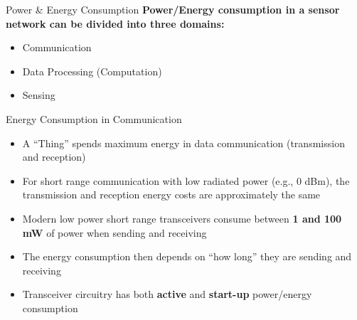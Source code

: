 \documentclass[aspectratio=169,11pt]{beamer}
\begin{document}
\begin{frame}{Power \& Energy Consumption}
    \textbf{Power/Energy consumption in a sensor network can be divided into three domains:}
    \begin{itemize}
        \item Communication
        \item Data Processing (Computation)
        \item Sensing
    \end{itemize}
    
    \vspace{0.5cm}
    \begin{center}
    \end{center}
\end{frame}

\begin{frame}{Energy Consumption in Communication}
    \begin{itemize}
        \item A ``Thing'' spends maximum energy in data communication (transmission and reception)
        \item For short range communication with low radiated power (e.g., 0 dBm), the transmission and reception energy costs are approximately the same
        \item Modern low power short range transceivers consume between \textbf{1 and 100 mW} of power when sending and receiving
        \item The energy consumption then depends on ``how long'' they are sending and receiving
        \item Transceiver circuitry has both \textbf{active} and \textbf{start-up} power/energy consumption
    \end{itemize}
\end{frame}
\end{document}
